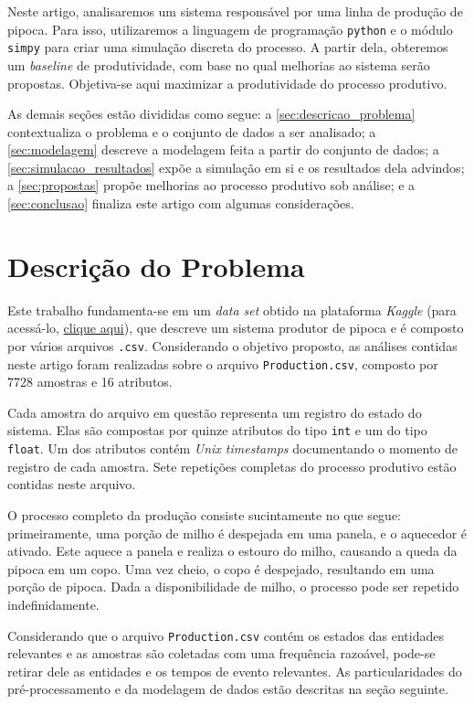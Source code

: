 \documentclass[12pt]{article}
\begin{document}
Neste artigo, analisaremos um sistema responsável por uma linha de produção de pipoca. Para isso, utilizaremos a linguagem de programação \texttt{python} e o módulo \texttt{simpy} para criar uma simulação discreta do processo. A partir dela, obteremos um \textit{baseline} de produtividade, com base no qual melhorias ao sistema serão propostas. Objetiva-se aqui maximizar a produtividade do processo produtivo.

As demais seções estão divididas como segue: a \autoref{sec:descricao_problema} contextualiza o problema e o conjunto de dados a ser analisado; a \autoref{sec:modelagem} descreve a modelagem feita a partir do conjunto de dados; a \autoref{sec:simulacao_resultados} expõe a simulação em si e os resultados dela advindos; a \autoref{sec:propostas} propõe melhorias ao processo produtivo sob análise; e a \autoref{sec:conclusao} finaliza este artigo com algumas considerações.

\section{Descrição do Problema}
\label{sec:descricao_problema}

Este trabalho fundamenta-se em um \textit{data set} obtido na plataforma \textit{Kaggle} (para acessá-lo, \href{https://www.kaggle.com/inIT-OWL/versatileproductionsystem}{clique aqui}), que descreve um sistema produtor de pipoca e é composto por vários arquivos \texttt{.csv}. Considerando o objetivo proposto, as análises contidas neste artigo foram realizadas sobre o arquivo \texttt{Production.csv}, composto por 7728 amostras e 16 atributos.

Cada amostra do arquivo em questão representa um registro do estado do sistema. Elas são compostas por quinze atributos do tipo \texttt{int} e um do tipo \texttt{float}. Um dos atributos contém \textit{Unix timestamps} documentando o momento de registro de cada amostra. Sete repetições completas do processo produtivo estão contidas neste arquivo.

O processo completo da produção consiste sucintamente no que segue: primeiramente, uma porção de milho é despejada em uma panela, e o aquecedor é ativado. Este aquece a panela e realiza o estouro do milho, causando a queda da pipoca em um copo. Uma vez cheio, o copo é despejado, resultando em uma porção de pipoca. Dada a disponibilidade de milho, o processo pode ser repetido indefinidamente.

Considerando que o arquivo \texttt{Production.csv} contém os estados das entidades relevantes e as amostras são coletadas com uma frequência razoável, pode-se retirar dele as entidades e os tempos de evento relevantes. As particularidades do pré-processamento e da modelagem de dados estão descritas na seção seguinte.
\end{document}
